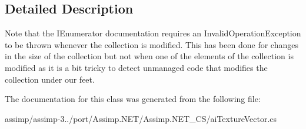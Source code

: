 \subsection{Detailed Description}
Note that the I\+Enumerator documentation requires an Invalid\+Operation\+Exception to be thrown whenever the collection is modified. This has been done for changes in the size of the collection but not when one of the elements of the collection is modified as it is a bit tricky to detect unmanaged code that modifies the collection under our feet. 

The documentation for this class was generated from the following file\+:\begin{DoxyCompactItemize}
\item 
assimp/assimp-\/3../port/\+Assimp.\+N\+E\+T/\+Assimp.\+N\+E\+T\+\_\+\+C\+S/ai\+Texture\+Vector.\+cs\end{DoxyCompactItemize}
